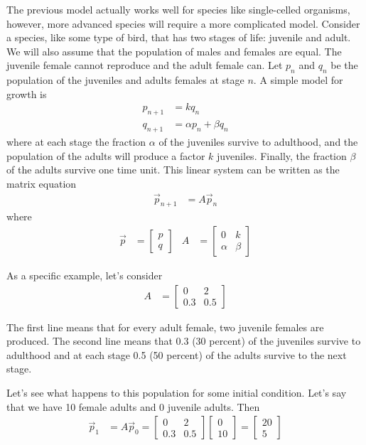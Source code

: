 The previous model actually works well for species like single-celled organisms, however, more advanced species will require a more complicated model.  Consider a species, like some type of bird, that has two stages of life: juvenile and adult.  We will also assume that the population of males and females are equal.  The juvenile female cannot reproduce and the adult female can.  Let $p_n$ and $q_n$ be the population of the juveniles and adults females at stage $n$.  A simple model for growth is
% 
\begin{align*}
 p_{n+1} & = k q_n \\
 q_{n+1} & = \alpha p_n + \beta q_n 
\end{align*}
where at each stage the fraction $\alpha$ of the juveniles survive to adulthood, and the population of the adults will produce a factor $k$ juveniles.  Finally, the fraction $\beta$ of the adults survive one time unit.   This linear system can be written as the matrix equation
% 
\begin{align*}
 \vec{p}_{n+1}  & = A \vec{p}_n
\end{align*}
where 
\begin{align*}
\vec{p} &= 
\begin{bmatrix}
 p \\ q 
\end{bmatrix}
& A & = 
\begin{bmatrix}
 0 & k \\ \alpha & \beta 
\end{bmatrix}
\end{align*}
 
 
As a specific example, let's consider 
% 
\begin{align*}
 A & = 
\begin{bmatrix}
 0 & 2 \\
 0.3 & 0.5 
\end{bmatrix}
\end{align*}

The first line means that for every adult female, two juvenile females are produced.  The second line means that 0.3 (30 percent) of the juveniles survive to adulthood and at each stage 0.5 (50 percent) of the adults survive to the next stage. 

Let's see what happens to this population for some initial condition. Let's say that we have 10 female adults and 0 juvenile adults. Then 
% 
\begin{align*}
 \vec{p}_1 & = A \vec{p}_0 = 
\begin{bmatrix}
 0 & 2 \\
 0.3 & 0.5 
\end{bmatrix} 
\begin{bmatrix}
0\\ 10 
\end{bmatrix} = 
\begin{bmatrix}
 20 \\ 5 
\end{bmatrix}
\end{align*}
 
